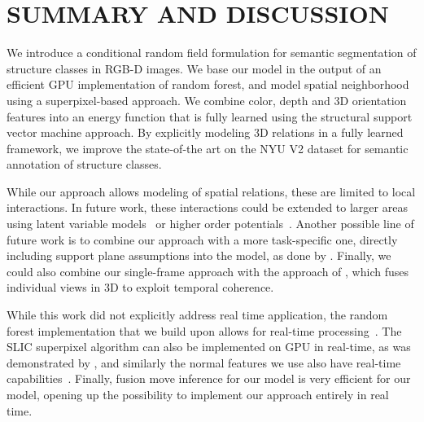 \documentclass[a4paper, 10pt, conference]{ieeeconf}      %
\begin{document}
\section{SUMMARY AND DISCUSSION}
We introduce a conditional random field formulation for semantic segmentation
of structure classes in RGB-D images. We base our model in the output of an efficient GPU implementation
of random forest, and model spatial neighborhood using a superpixel-based approach.
We combine color, depth and 3D orientation features into an energy function that is fully learned using 
 the structural support vector machine approach.  By explicitly modeling 3D
 relations in a fully learned framework, we improve the state-of-the art on the
 NYU V2 dataset for semantic annotation of structure classes.


While our approach allows modeling of spatial relations, these are limited to
local interactions. In future work, these interactions could be extended to
larger areas using latent variable models~\citep{dann2012pottics} or higher
order potentials~\citep{kohli2009robust}.
Another possible line of future work is to combine our approach with a more
task-specific one, directly including support plane assumptions into the model,
as done by \citet{SilbermanECCV12}. Finally, we could also combine our
single-frame approach with the approach of \citet{stueckler2013}, which fuses
individual views in 3D to exploit temporal coherence.

While this work did not explicitly address real time application, the random
forest implementation that we build upon allows for real-time
processing~\citep{stueckler2013}. The SLIC superpixel algorithm can also be
implemented on GPU in real-time, as was demonstrated by \citep{ren2011gslic}, and similarly
the normal features we use also have
real-time capabilities~\citep{holz_2011_robocup}.
Finally, fusion move inference for our model is very efficient for our model,
opening up the possibility to implement our approach entirely in real time.

\printbibliography{}
\end{document}
